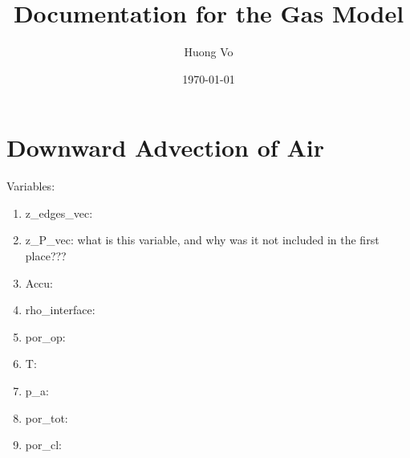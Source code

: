 \documentclass{article}
\author{Huong Vo}
\title{Documentation for the Gas Model}
\date{\today}
\begin{document}
\maketitle
\newpage
\tableofcontents
\newpage
\section{Downward Advection of Air}
Variables:
\begin{enumerate}
\item z\_edges\_vec:
\item z\_P\_vec: what is this variable, and why was it not included in the first place???
\item Accu:
\item rho\_interface:
\item por\_op:
\item T:
\item p\_a:
\item por\_tot:
\item por\_cl:
\end{enumerate}
\end{document}
